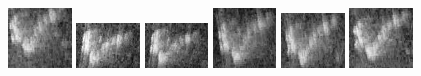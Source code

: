 \begin{figure}
    \includegraphics[width=0.15\textwidth]{chapters/images/dataset/all-class-images/hook/hook-57.jpg}
    \includegraphics[width=0.15\textwidth]{chapters/images/dataset/all-class-images/hook/hook-123.jpg}
    \includegraphics[width=0.15\textwidth]{chapters/images/dataset/all-class-images/hook/hook-118.jpg}
    \includegraphics[width=0.15\textwidth]{chapters/images/dataset/all-class-images/hook/hook-67.jpg}
    \includegraphics[width=0.15\textwidth]{chapters/images/dataset/all-class-images/hook/hook-99.jpg}
    \includegraphics[width=0.15\textwidth]{chapters/images/dataset/all-class-images/hook/hook-54.jpg}
    

\end{figure}
